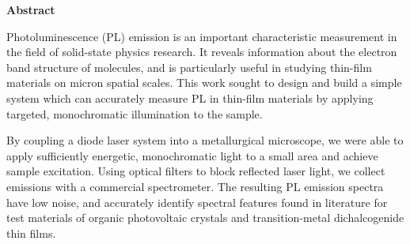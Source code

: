 \thispagestyle{plain}
\begin{center}
 
 
    \textbf{Abstract}
\end{center}

Photoluminescence (PL) emission is an important characteristic measurement in the field of solid-state physics research. It reveals information about the electron band structure of molecules, and is particularly useful in studying thin-film materials on micron spatial scales. This work sought to design and build a simple system which can accurately measure PL in thin-film materials by applying targeted, monochromatic illumination to the sample.

By coupling a diode laser system into a metallurgical microscope, we were able to apply sufficiently energetic, monochromatic light to a small area and achieve sample excitation. Using optical filters to block reflected laser light, we collect emissions with a commercial spectrometer. The resulting PL emission spectra have low noise, and accurately identify spectral features found in literature for test materials of organic photovoltaic crystals and transition-metal dichalcogenide thin films.